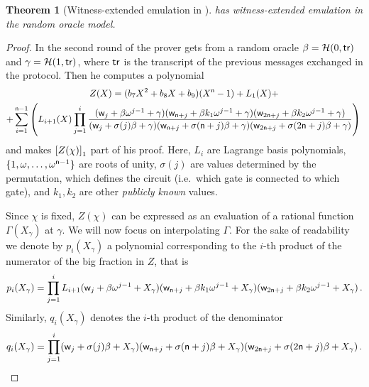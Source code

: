 \documentclass[runningheads]{llncs}
\newtheorem{theorem}{Theorem}%
\theoremstyle{definition}
\begin{document}
\begin{theorem}[Witness-extended emulation in \plonk{}]
  \plonk{} has witness-extended emulation in the random oracle model.
\end{theorem}
\begin{proof}
In the second round of \plonk{} the prover gets from a random oracle $\beta = \mathcal{H}(0, \mathsf{tr})$ and $\gamma = \mathcal{H}(1, \mathsf{tr})$, where $\mathsf{tr}$ is the transcript of the previous messages exchanged in the protocol. Then he computes a polynomial
\begin{multline*}
  \label{eq:Z}
  Z(X) = (b_7 X^2 + b_8 X + b_9) (X^{\mathsf{n}} - 1) + L_1 (X) + \\
   + \sum_{i = 1}^{\mathsf{n} - 1}\left(L_{i + 1}(X) \prod_{j = 1}^{i} 
  \frac{(\mathsf{w}_j + \beta \omega^{j - 1} + \gamma)(\mathsf{w}_{\mathsf{n} + j} + \beta k_1 \omega^{j - 1} + \gamma) (\mathsf{w}_{2\mathsf{n} + j} + \beta k_2 \omega^{j - 1} + \gamma)}
  {(\mathsf{w}_j + \sigma(j)\beta + \gamma)(\mathsf{w}_{\mathsf{n} + j} + \sigma(\mathsf{n} + j)\beta + \gamma)(\mathsf{w}_{2\mathsf{n} + j} + \sigma (2\mathsf{n} + j) \beta + \gamma)}
  \right)\,
\end{multline*}
and makes $\left[Z(\chi)\right]_{1}$ part of his proof. 
Here, $L_i$ are Lagrange basis polynomials, $\{1, \omega, \ldots, \omega^{\mathsf{n} - 1}\}$ are roots of unity, $\sigma(j)$ are values determined by the permutation, which defines the circuit (i.e.~which gate is connected to which gate), and $k_1, k_2$ are other \emph{publicly known} values.

Since $\chi$ is fixed, $Z(\chi)$ can be expressed as an evaluation of a rational function $\Gamma(X_\gamma)$ at $\gamma$. We will now focus on interpolating $\Gamma$.
For the sake of readability we denote by $p_i (X_\gamma)$ a polynomial corresponding to the $i$-th product of the numerator of the big fraction in $Z$, that is
\[
  p_i(X_\gamma) = \prod_{j = 1}^{i} L_{i + 1} (\mathsf{w}_j + \beta \omega^{j - 1} + X_\gamma)(\mathsf{w}_{\mathsf{n} + j} + \beta k_1 \omega^{j - 1} + X_\gamma) (\mathsf{w}_{2\mathsf{n} + j} + \beta k_2 \omega^{j - 1} + X_\gamma)\,.
\]
Similarly, $q_i (X_\gamma)$ denotes the $i$-th product of the denominator
\[
  q_i(X_\gamma) = \prod_{j = 1}^{i} (\mathsf{w}_j + \sigma(j)\beta + X_\gamma)(\mathsf{w}_{\mathsf{n} + j} + \sigma(\mathsf{n} + j)\beta + X_\gamma)(\mathsf{w}_{2\mathsf{n} + j} + \sigma (2\mathsf{n} + j) \beta + X_\gamma)\,.
\]


\end{proof}
\end{document}
